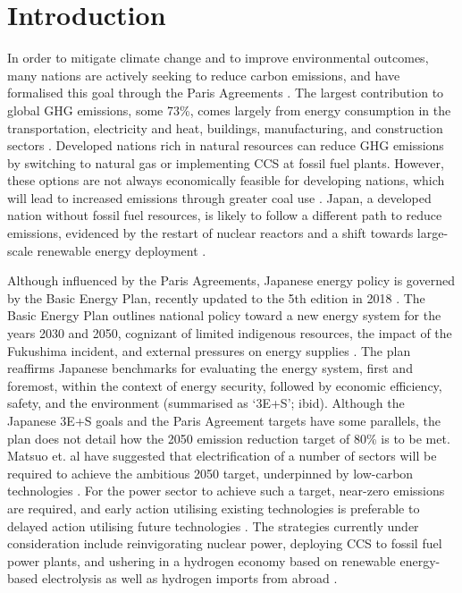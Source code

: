 \section{Introduction} \label{Introduction}
In order to mitigate climate change and to improve environmental outcomes, many nations are actively seeking to reduce carbon emissions, and have formalised this goal through the Paris Agreements \cite{united_nations_framework_convention_on_climate_change_unfccc_submission_2015}. The largest contribution to global \gls{GHG} emissions, some 73\%, comes largely from energy consumption in the transportation, electricity and heat, buildings, manufacturing, and construction sectors \cite{ge_4_2020}. Developed nations rich in natural resources can reduce \gls{GHG} emissions by switching to natural gas or implementing \gls{CCS} at fossil fuel plants. However, these options are not always economically feasible for developing nations, which will lead to increased emissions through greater coal use \cite{international_energy_agency_latest_2019}. Japan, a developed nation without fossil fuel resources, is likely to follow a different path to reduce emissions, evidenced by the restart of nuclear reactors and a shift towards large-scale renewable energy deployment \cite{international_energy_agency_latest_2019}.

Although influenced by the Paris Agreements, Japanese energy policy is governed by the Basic Energy Plan, recently updated to the 5th edition in 2018 \cite{noauthor_japans_2018}. The Basic Energy Plan outlines national policy toward a new energy system for the years 2030 and 2050, cognizant of limited indigenous resources, the impact of the Fukushima incident, and external pressures on energy supplies \cite{meti_annual_2018}. The plan reaffirms Japanese benchmarks for evaluating the energy system, first and foremost, within the context of energy security, followed by economic efficiency, safety, and the environment (summarised as `3E+S'; ibid). Although the Japanese 3E+S goals and the Paris Agreement targets have some parallels, the plan does not detail how the 2050 emission reduction target of 80\% is to be met. Matsuo et. al have suggested that electrification of a number of sectors will be required to achieve the ambitious 2050 target, underpinned by low-carbon technologies \cite{matsuo_quantitative_2018}. For the power sector to achieve such a target, near-zero emissions are required, and early action utilising existing technologies is preferable to delayed action utilising future technologies \cite{ashina_roadmap_2012}. The strategies currently under consideration include reinvigorating nuclear power, deploying \gls{CCS} to fossil fuel power plants, and ushering in a hydrogen economy based on renewable energy-based electrolysis as well as hydrogen imports from abroad \cite{ashina_roadmap_2012, matsuo_quantitative_2018, noauthor_basic_2017}. 

